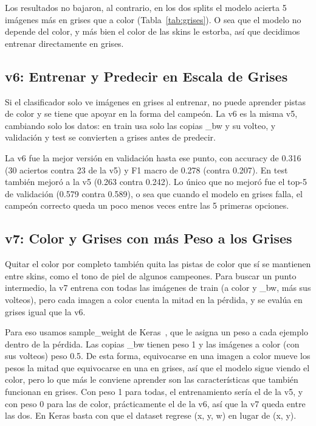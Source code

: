 \documentclass[10pt,twocolumn]{article}
\begin{document}
Los resultados no bajaron, al contrario, en los dos splits el modelo acierta 5 imágenes más en grises que a color (Tabla~\ref{tab:grises}). O sea que el modelo no depende del color, y más bien el color de las skins le estorba, así que decidimos entrenar directamente en grises.

\subsection{v6: Entrenar y Predecir en Escala de Grises}

Si el clasificador solo ve imágenes en grises al entrenar, no puede aprender pistas de color y se tiene que apoyar en la forma del campeón. La v6 es la misma v5, cambiando solo los datos: en train usa solo las copias \_bw y su volteo, y validación y test se convierten a grises antes de predecir.

La v6 fue la mejor versión en validación hasta ese punto, con accuracy de 0.316 (30 aciertos contra 23 de la v5) y F1 macro de 0.278 (contra 0.207). En test también mejoró a la v5 (0.263 contra 0.242). Lo único que no mejoró fue el top-5 de validación (0.579 contra 0.589), o sea que cuando el modelo en grises falla, el campeón correcto queda un poco menos veces entre las 5 primeras opciones.

\subsection{v7: Color y Grises con más Peso a los Grises}

Quitar el color por completo también quita las pistas de color que sí se mantienen entre skins, como el tono de piel de algunos campeones. Para buscar un punto intermedio, la v7 entrena con todas las imágenes de train (a color y \_bw, más sus volteos), pero cada imagen a color cuenta la mitad en la pérdida, y se evalúa en grises igual que la v6.

Para eso usamos sample\_weight de Keras~\cite{keras}, que le asigna un peso a cada ejemplo dentro de la pérdida. Las copias \_bw tienen peso 1 y las imágenes a color (con sus volteos) peso 0.5. De esta forma, equivocarse en una imagen a color mueve los pesos la mitad que equivocarse en una en grises, así que el modelo sigue viendo el color, pero lo que más le conviene aprender son las características que también funcionan en grises. Con peso 1 para todas, el entrenamiento sería el de la v5, y con peso 0 para las de color, prácticamente el de la v6, así que la v7 queda entre las dos. En Keras basta con que el dataset regrese (x, y, w) en lugar de (x, y).
\end{document}
